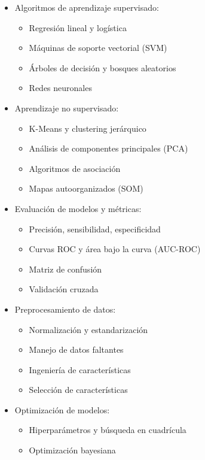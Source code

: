 \documentclass[12pt]{article}
\begin{document}
\begin{itemize}
    \item Algoritmos de aprendizaje supervisado:
        \begin{itemize}
            \item Regresión lineal y logística
            \item Máquinas de soporte vectorial (SVM)
            \item Árboles de decisión y bosques aleatorios
            \item Redes neuronales
        \end{itemize}
    \item Aprendizaje no supervisado:
        \begin{itemize}
            \item K-Means y clustering jerárquico
            \item Análisis de componentes principales (PCA)
            \item Algoritmos de asociación
            \item Mapas autoorganizados (SOM)
        \end{itemize}
    \item Evaluación de modelos y métricas:
        \begin{itemize}
            \item Precisión, sensibilidad, especificidad
            \item Curvas ROC y área bajo la curva (AUC-ROC)
            \item Matriz de confusión
            \item Validación cruzada
        \end{itemize}
    \item Preprocesamiento de datos:
        \begin{itemize}
            \item Normalización y estandarización
            \item Manejo de datos faltantes
            \item Ingeniería de características
            \item Selección de características
        \end{itemize}
    \item Optimización de modelos:
        \begin{itemize}
            \item Hiperparámetros y búsqueda en cuadrícula
            \item Optimización bayesiana

\end{itemize}
\end{itemize}
\end{document}
